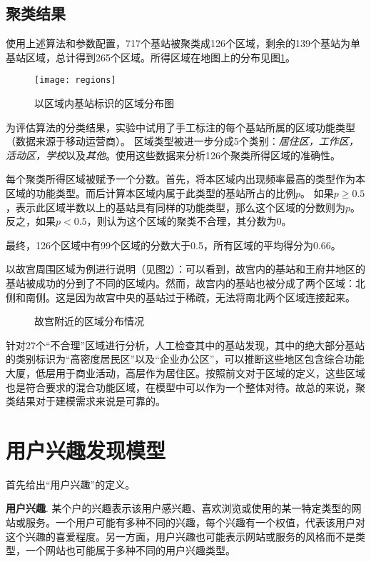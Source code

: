 \subsection{聚类结果}
使用上述算法和参数配置，717个基站被聚类成126个区域，剩余的139个基站为单基站区域，总计得到265个区域。所得区域在地图上的分布见图\ref{interest:fig:regions}。

\begin{figure}
\centering
\texttt{[image: regions]}
\caption{以区域内基站标识的区域分布图}
\label{interest:fig:regions}
\end{figure}

为评估算法的分类结果，实验中试用了手工标注的每个基站所属的区域功能类型（数据来源于移动运营商）。
区域类型被进一步分成5个类别：\textit{居住区，工作区，活动区，学校}以及\textit{其他}。使用这些数据来分析126个聚类所得区域的准确性。

每个聚类所得区域被赋予一个分数。首先，将本区域内出现频率最高的类型作为本区域的功能类型。而后计算本区域内属于此类型的基站所占的比例$p$。
如果$p \geq 0.5$，表示此区域半数以上的基站具有同样的功能类型，那么这个区域的分数则为$p$。反之，如果$p < 0.5$，则认为这个区域的聚类不合理，其分数为0。

最终，126个区域中有99个区域的分数大于0.5，所有区域的平均得分为0.66。

以故宫周围区域为例进行说明（见图\ref{interest:fig:fob}）：可以看到，故宫内的基站和王府井地区的基站被成功的分到了不同的区域内。然而，故宫内的基站也被分成了两个区域：北侧和南侧。这是因为故宫中央的基站过于稀疏，无法将南北两个区域连接起来。

\begin{figure}
\centering
{}
\caption{故宫附近的区域分布情况}
\label{interest:fig:fob}
\end{figure}

针对27个``不合理''区域进行分析，人工检查其中的基站发现，其中的绝大部分基站的类别标识为``高密度居民区''以及``企业办公区''，可以推断这些地区包含综合功能大厦，低层用于商业活动，高层作为居住区。按照前文对于区域的定义，这些区域也是符合要求的混合功能区域，在模型中可以作为一个整体对待。故总的来说，聚类结果对于建模需求来说是可靠的。


\section{用户兴趣发现模型}
\label{interest:sec:uri}
首先给出``用户兴趣''的定义。

\begin{definition}
\label{interest:def:ui}
\textbf{用户兴趣}. 某个户的兴趣表示该用户感兴趣、喜欢浏览或使用的某一特定类型的网站或服务。一个用户可能有多种不同的兴趣，每个兴趣有一个权值，代表该用户对这个兴趣的喜爱程度。另一方面，用户兴趣也可能表示网站或服务的风格而不是类型，一个网站也可能属于多种不同的用户兴趣类型。
\end{definition}

